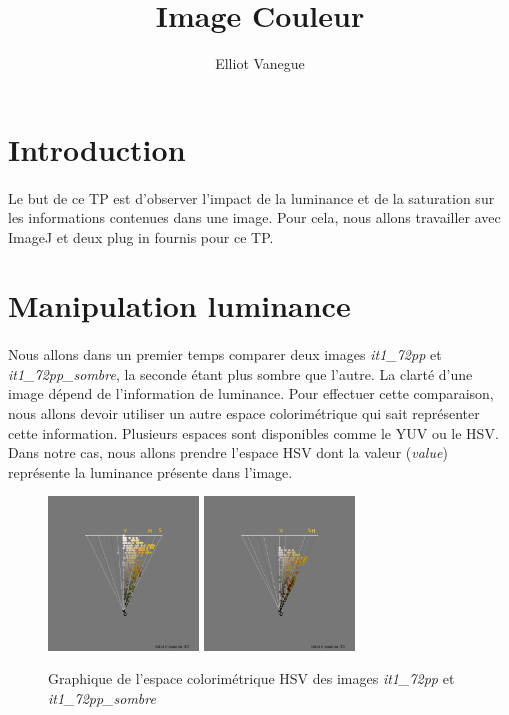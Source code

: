 \documentclass[a4paper,10pt]{article}
\title{Image Couleur}
\author{Elliot Vanegue}
\begin{document}
\maketitle
\section{Introduction}
\paragraph{}Le but de ce TP est d'observer l'impact de la luminance et de la saturation sur les informations contenues dans une image. Pour cela, nous allons travailler avec ImageJ et deux plug in fournis pour ce TP.

\section{Manipulation luminance}
\paragraph{}Nous allons dans un premier temps comparer deux images \textit{it1\_72pp} et \textit{it1\_72pp\_sombre}, la seconde étant plus sombre que l'autre.
La clarté d'une image dépend de l'information de luminance.
Pour effectuer cette comparaison, nous allons devoir utiliser un autre espace colorimétrique qui
sait représenter cette information. Plusieurs espaces sont disponibles comme le YUV ou le HSV.
Dans notre cas, nous allons prendre l'espace HSV dont la valeur (\textit{value}) représente 
la luminance présente dans l'image.\\

\begin{figure}[!h]
 \begin{center}
 \includegraphics[width=4cm]{resultat/luminance1.png}
 \includegraphics[width=4cm]{resultat/luminance2.png}
 \caption{Graphique de l'espace colorimétrique HSV des images \textit{it1\_72pp} et \textit{it1\_72pp\_sombre}}
 \end{center}
\end{figure}
\end{document}

